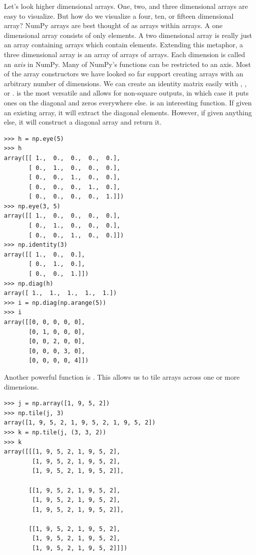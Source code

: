 Let's look higher dimensional arrays.
One, two, and three dimensional arrays are easy to visualize.
But how do we visualize a four, ten, or fifteen dimensional array?
NumPy arrays are best thought of as arrays within arrays.
A one dimensional array consists of only elements.
A two dimensional array is really just an array containing arrays which contain elements.
Extending this metaphor, a three dimensional array is an array of arrays of arrays.
Each dimension is called an \emph{axis} in NumPy.  Many of NumPy's functions can be restricted to an axis.
Most of the array constructors we have looked so far support creating arrays with an arbitrary number of dimensions.
We can create an identity matrix easily with , , or .
 is the most versatile and allows for non-square outputs, in which case it puts ones on the diagonal and zeros everywhere else.
 is an interesting function.  If given an existing array, it will extract the diagonal elements.
However, if given anything else, it will construct a diagonal array and return it.
\begin{lstlisting}
>>> h = np.eye(5)
>>> h
array([[ 1.,  0.,  0.,  0.,  0.],
       [ 0.,  1.,  0.,  0.,  0.],
       [ 0.,  0.,  1.,  0.,  0.],
       [ 0.,  0.,  0.,  1.,  0.],
       [ 0.,  0.,  0.,  0.,  1.]])
>>> np.eye(3, 5)
array([[ 1.,  0.,  0.,  0.,  0.],
       [ 0.,  1.,  0.,  0.,  0.],
       [ 0.,  0.,  1.,  0.,  0.]])
>>> np.identity(3)
array([[ 1.,  0.,  0.],
       [ 0.,  1.,  0.],
       [ 0.,  0.,  1.]])
>>> np.diag(h)
array([ 1.,  1.,  1.,  1.,  1.])
>>> i = np.diag(np.arange(5))
>>> i
array([[0, 0, 0, 0, 0],
       [0, 1, 0, 0, 0],
       [0, 0, 2, 0, 0],
       [0, 0, 0, 3, 0],
       [0, 0, 0, 0, 4]])
\end{lstlisting}
Another powerful function is .
This allows us to tile arrays across one or more dimensions.
\begin{lstlisting}
>>> j = np.array([1, 9, 5, 2])
>>> np.tile(j, 3)
array([1, 9, 5, 2, 1, 9, 5, 2, 1, 9, 5, 2])
>>> k = np.tile(j, (3, 3, 2))
>>> k
array([[[1, 9, 5, 2, 1, 9, 5, 2],
        [1, 9, 5, 2, 1, 9, 5, 2],
        [1, 9, 5, 2, 1, 9, 5, 2]],

       [[1, 9, 5, 2, 1, 9, 5, 2],
        [1, 9, 5, 2, 1, 9, 5, 2],
        [1, 9, 5, 2, 1, 9, 5, 2]],

       [[1, 9, 5, 2, 1, 9, 5, 2],
        [1, 9, 5, 2, 1, 9, 5, 2],
        [1, 9, 5, 2, 1, 9, 5, 2]]])
\end{lstlisting}

